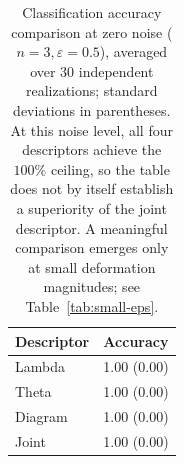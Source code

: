 \begin{table}[htbp]\centering
\caption{Classification accuracy comparison at zero noise
(\(n=3, \varepsilon=0.5\)), averaged over 30 independent realizations;
standard deviations in parentheses. At this noise level, all four descriptors
achieve the \(100\% \) ceiling, so the table does not by itself establish a
superiority of the joint descriptor. A meaningful comparison emerges only
at small deformation magnitudes; see Table~\ref{tab:small-eps}.}
\label{tab:baseline}
\begin{tabular}{lc}\hline
Descriptor & Accuracy \\\hline
Lambda & 1.00 (0.00) \\
Theta & 1.00 (0.00) \\
Diagram & 1.00 (0.00) \\
Joint & 1.00 (0.00) \\
\hline\end{tabular}\end{table}